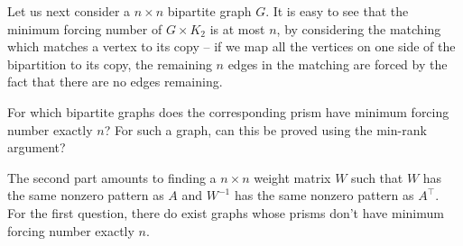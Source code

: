 Let us next consider a $n \times n$ bipartite graph $G$. It is easy to see that the minimum forcing number of $G \times K_2$ is at most $n$, by considering the matching which matches a vertex to its copy -- if we map all the vertices on one side of the bipartition to its copy, the remaining $n$ edges in the matching are forced by the fact that there are no edges remaining.\\

\begin{question}
For which bipartite graphs does the corresponding prism have minimum forcing number exactly $n$? For such a graph, can this be proved using the min-rank argument?
\end{question}

The second part amounts to finding a $n \times n$ weight matrix $W$ such that $W$ has the same nonzero pattern as $A$ and $W^{-1}$ has the same nonzero pattern as $A^\top$.\\

For the first question, there do exist graphs whose prisms don't have minimum forcing number exactly $n$.

